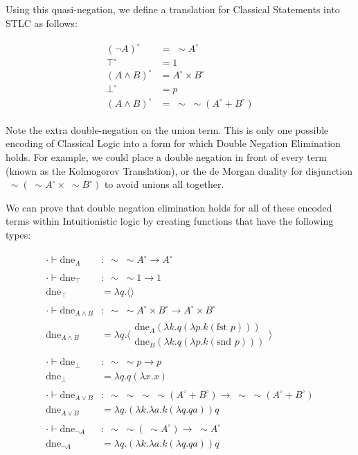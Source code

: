 \documentclass{article}
\newcommand{\inlineeq}[1]{
    \vspace{-2em}
    \begin{gather*}
    #1
    \end{gather*}
    \vspace{-2em}
}
\newcommand{\quasi}[0]{\; \sim \!}
\begin{document}
Using this quasi-negation, we define a translation for Classical Statements into STLC as follows:

\inlineeq{
\begin{split}
    (\lnot A)^{\circ} &= \quasi A^{\circ}\\
    \top^{\circ} &= 1\\
    (A \land B)^{\circ} &= A^{\circ} \times B^{\circ}\\
    \bot^{\circ} &= p\\
    (A \land B)^{\circ} &= \quasi\quasi (A^{\circ} + B^{\circ})
\end{split}
}

Note the extra double-negation on the union term. This is only one possible encoding of Classical Logic into a form for which Double Negation Elimination holds. For example, we could place a double negation in front of every term (known as the Kolmogorov Translation), or the de Morgan duality for disjunction $\quasi (\quasi A^{\circ} \times \quasi B^{\circ})$ to avoid unions all together.

We can prove that double negation elimination holds for all of these encoded terms within Intuitionistic logic by creating functions that have the following types:

\inlineeq{
\begin{split}
    \cdot \vdash \textrm{dne}_A&: \quasi \quasi A^{\circ} \to A^{\circ}\\
    &\\
    \cdot \vdash \textrm{dne}_\top &: \quasi \quasi 1 \to 1 \\
    \textrm{dne}_\top &= \lambda q. \langle \rangle \\
    &\\
    \cdot \vdash \textrm{dne}_{A \land B}&: \quasi \quasi A^{\circ} \times B^{\circ} \to A^{\circ} \times B^{\circ}\\
    \textrm{dne}_{A \land B} &= \lambda q. \langle \substack{\textrm{dne}_A (\lambda k. q(\lambda p. k(\textrm{fst } p)))\\\textrm{dne}_B (\lambda k. q(\lambda p. k(\textrm{snd } p)))} \rangle\\
    &\\
    \cdot \vdash \textrm{dne}_\bot &: \quasi \quasi p \to p \\
    \textrm{dne}_\bot &= \lambda q. q (\lambda x. x) \\
    &\\
    \cdot \vdash \textrm{dne}_{A \lor B} &: \quasi \quasi \quasi \quasi (A^{\circ} + B^{\circ}) \to \quasi \quasi (A^{\circ} + B^{\circ}) \\
    \textrm{dne}_{A \lor B} &= \lambda q. (\lambda k. \lambda a. k (\lambda q. q a)) q \\
    &\\
    \cdot \vdash \textrm{dne}_{\lnot A} &: \quasi \quasi (\quasi A^{\circ}) \to \quasi A^{\circ} \\
    \textrm{dne}_{\lnot A} &= \lambda q. (\lambda k. \lambda a. k (\lambda q. q a)) q 
\end{split}
}
\end{document}

